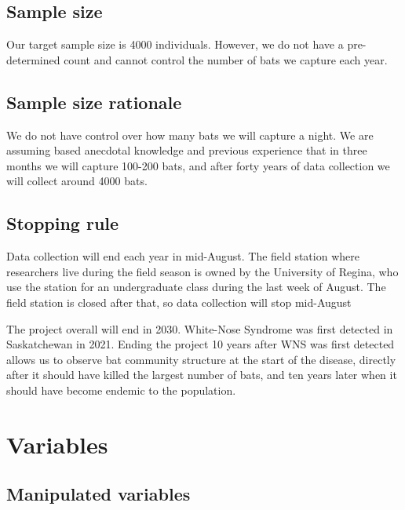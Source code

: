\documentclass[]{article}
\begin{document}
\hypertarget{sample-size}{%
\subsection{Sample size}\label{sample-size}}

Our target sample size is 4000 individuals. However, we do not have a
pre-determined count and cannot control the number of bats we capture
each year.

\hypertarget{sample-size-rationale}{%
\subsection{Sample size rationale}\label{sample-size-rationale}}

We do not have control over how many bats we will capture a night. We
are assuming based anecdotal knowledge and previous experience that in
three months we will capture 100-200 bats, and after forty years of data
collection we will collect around 4000 bats.

\hypertarget{stopping-rule}{%
\subsection{Stopping rule}\label{stopping-rule}}

Data collection will end each year in mid-August. The field station
where researchers live during the field season is owned by the
University of Regina, who use the station for an undergraduate class
during the last week of August. The field station is closed after that,
so data collection will stop mid-August

The project overall will end in 2030. White-Nose Syndrome was first
detected in Saskatchewan in 2021. Ending the project 10 years after WNS
was first detected allows us to observe bat community structure at the
start of the disease, directly after it should have killed the largest
number of bats, and ten years later when it should have become endemic
to the population.

\hypertarget{variables}{%
\section{Variables}\label{variables}}

\hypertarget{manipulated-variables}{%
\subsection{Manipulated variables}\label{manipulated-variables}}
\end{document}
